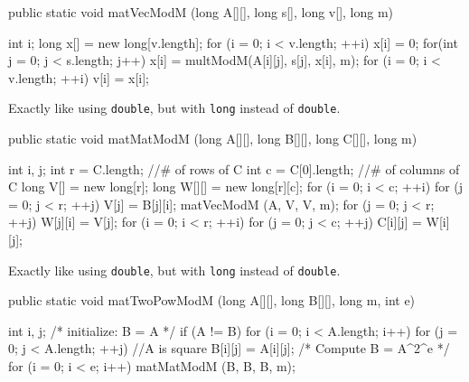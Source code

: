 \begin{code}

   public static void matVecModM (long A[][], long s[], long v[], long m) \begin{hide} {
      int i;
      long x[] = new long[v.length];
      for (i = 0; i < v.length;  ++i) {
         x[i] = 0;
         for(int j = 0; j < s.length; j++)
            x[i] = multModM(A[i][j], s[j], x[i], m);
      }
      for (i = 0; i < v.length;  ++i)
         v[i] = x[i];

   } \end{hide}
\end{code}
\begin{tabb} Exactly like  using \texttt{double}, but with \texttt{long} instead
  of \texttt{double}.
\end{tabb}
\begin{htmlonly}
\end{htmlonly}
\begin{code}

   public static void matMatModM (long A[][], long B[][], long C[][], long m) \begin{hide} {
      int i, j;
      int r = C.length;    //# of rows of C
      int c = C[0].length; //# of columns of C
      long V[] = new long[r];
      long W[][] = new long[r][c];
      for (i = 0; i < c;  ++i) {
         for (j = 0; j < r;  ++j)
            V[j] = B[j][i];
         matVecModM (A, V, V, m);
         for (j = 0; j < r;  ++j)
            W[j][i] = V[j];
      }
      for (i = 0; i < r;  ++i) {
         for (j = 0; j < c;  ++j)
            C[i][j] = W[i][j];
      }
   } \end{hide}
\end{code}
\begin{tabb} Exactly like  using \texttt{double}, but with \texttt{long} instead
  of \texttt{double}.
\end{tabb}
\begin{htmlonly}
\end{htmlonly}
\begin{code}

   public static void matTwoPowModM (long A[][], long B[][], long m, int e) \begin{hide} {
      int i, j;
      /* initialize: B = A */
      if (A != B) {
         for (i = 0; i < A.length; i++) {
            for (j = 0; j < A.length;  ++j)  //A is square
               B[i][j] = A[i][j];
         }
      }
      /* Compute B = A^{2^e} */
      for (i = 0; i < e; i++)
         matMatModM (B, B, B, m);
   } \end{hide}
\end{code}

